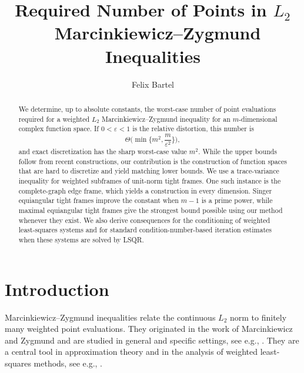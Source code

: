 \documentclass[a4paper]{amsart}
\numberwithin{equation}{section}
\begin{document}
\title{Required Number of Points in $L_2$~Marcinkiewicz--Zygmund Inequalities}

\author{Felix Bartel}
\address{
    Mathematical Institute for Machine Learning and Data Science (MIDS), Catholic University of Eichstätt--Ingolstadt,
    Auf der Schanz 49,
    85049 Ingolstadt, Germany
}

\begin{abstract}
    We determine, up to absolute constants, the worst-case number of point evaluations required for a weighted $L_2$ Marcinkiewicz--Zygmund inequality for an $m$-dimensional complex function space.
    If $0<\varepsilon<1$ is the relative distortion, this number is
    \begin{equation*}
        \Theta\Big(\min\Big\{m^2,\frac{m}{\varepsilon^2}\Big\}\Big) ,
    \end{equation*}
    and exact discretization has the sharp worst-case value $m^2$.
    While the upper bounds follow from recent constructions, our contribution is the construction of function spaces that are hard to discretize and yield matching lower bounds.
    We use a trace-variance inequality for weighted subframes of unit-norm tight frames.
    One such instance is the complete-graph edge frame, which yields a construction in every dimension.
    Singer equiangular tight frames improve the constant when $m-1$ is a prime power, while maximal equiangular tight frames give the strongest bound possible using our method whenever they exist.
    We also derive consequences for the conditioning of weighted least-squares systems and for standard condition-number-based iteration estimates when these systems are solved by LSQR.
\end{abstract}


\maketitle

\section{Introduction}

Marcinkiewicz--Zygmund inequalities relate the continuous $L_2$ norm to finitely many weighted point evaluations.
They originated in the work of Marcinkiewicz and Zygmund \cite{MZ37} and are studied in general and specific settings, see e.g., \cite{Filbir11,Temlyakov18,DTT19,KKLT22}.
They are a central tool in approximation theory and in the analysis of weighted least-squares methods, see e.g., \cite{CDL13,BKPU23,Bartel23,CDKU26}.
\end{document}
